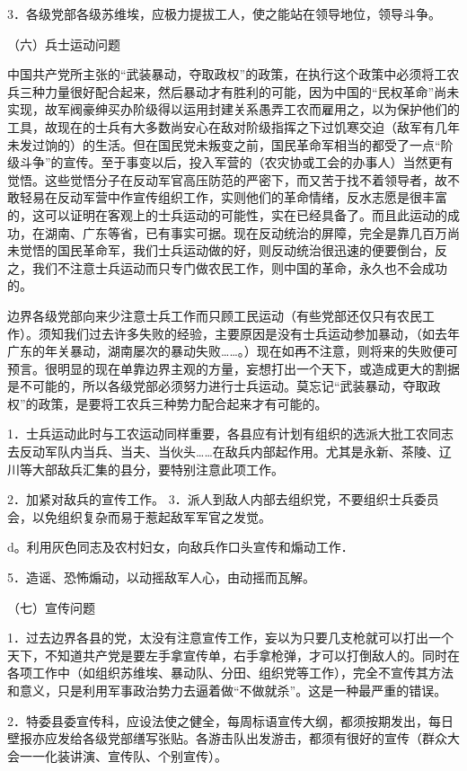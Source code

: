 3．各级党部各级苏维埃，应极力提拔工人，使之能站在领导地位，领导斗争。

（六）兵士运动问题

中国共产党所主张的“武装暴动，夺取政权”的政策，在执行这个政策中必须将工农兵三种力量很好配合起来，然后暴动才有胜利的可能，因为中国的“民权革命”尚未实现，故军阀豪绅买办阶级得以运用封建关系愚弄工农而雇用之，以为保护他们的工具，故现在的士兵有大多数尚安心在敌对阶级指挥之下过饥寒交迫（敌军有几年未发过饷的）的生活。但在国民党未叛变之前，国民革命军相当的都受了一点“阶级斗争”的宣传。至于事变以后，投入军营的（农灾协或工会的办事人）当然更有觉悟。这些觉悟分子在反动军官高压防范的严密下，而又苦于找不着领导者，故不敢轻易在反动军营中作宣传组织工作，实则他们的革命情绪，反水志愿是很丰富的，这可以证明在客观上的士兵运动的可能性，实在已经具备了。而且此运动的成功，在湖南、广东等省，已有事实可据。现在反动统治的屏障，完全是靠几百万尚未觉悟的国民革命军，我们士兵运动做的好，则反动统治很迅速的便要倒台，反之，我们不注意士兵运动而只专门做农民工作，则中国的革命，永久也不会成功的。

边界各级党部向来少注意士兵工作而只顾工民运动（有些党部还仅只有农民工作）。须知我们过去许多失败的经验，主要原因是没有士兵运动参加暴动，（如去年广东的年关暴动，湖南屡次的暴动失败……。）现在如再不注意，则将来的失败便可预言。很明显的现在单靠边界主观的方量，妄想打出一个天下，或造成更大的割据是不可能的，所以各级党部必须努力进行士兵运动。莫忘记“武装暴动，夺取政权”的政策，是要将工农兵三种势力配合起来才有可能的。

1．士兵运动此时与工农运动同样重要，各县应有计划有组织的选派大批工农同志去反动军队内当兵、当夫、当伙头……在敌兵内部起作用。尤其是永新、茶陵、辽川等大部敌兵汇集的县分，要特别注意此项工作。

2．加紧对敌兵的宣传工作。 
3．派人到敌人内部去组织党，不要组织士兵委员会，以免组织复杂而易于惹起敌军军官之发觉。

d。利用灰色同志及农村妇女，向敌兵作口头宣传和煽动工作．

5．造谣、恐怖煽动，以动摇敌军人心，由动摇而瓦解。

（七）宣传问题

1．过去边界各县的党，太没有注意宣传工作，妄以为只要几支枪就可以打出一个天下，不知道共产党是要左手拿宣传单，右手拿枪弹，才可以打倒敌人的。同时在各项工作中（如组织苏维埃、暴动队、分田、组织党等工作），完全不宣传其方法和意义，只是利用军事政治势力去逼着做“不做就杀”。这是一种最严重的错误。

2．特委县委宣传科，应设法使之健全，每周标语宣传大纲，都须按期发出，每日壁报亦应发给各级党部缮写张贴。各游击队出发游击，都须有很好的宣传（群众大会一一化装讲演、宣传队、个别宣传）。

